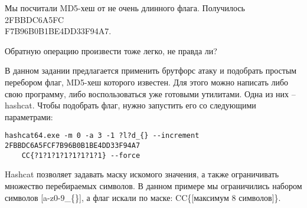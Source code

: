 
Мы посчитали MD5-хеш от не очень длинного флага. Получилось 2FBBDC6A5FC\\F7B96B0B1BE4DD33F94A7.

Обратную операцию произвести тоже легко, не правда ли?

\solutionSection

В данном задании предлагается применить брутфорс атаку и подобрать простым перебором флаг, MD5-хеш которого известен. Для этого можно написать либо свою программу, либо воспользоваться уже готовыми утилитами. Одна из них – hashcat. Чтобы подобрать флаг, нужно запустить его со следующими параметрами:
\begin{verbatim}
hashcat64.exe -m 0 -a 3 -1 ?l?d_{} --increment 2FBBDC6A5FCF7B96B0B1BE4DD33F94A7 
    CC{?1?1?1?1?1?1?1?1} --force
\end{verbatim}

Hashcat позволяет задавать маску искомого значения, а также ограничивать множество перебираемых символов. В данном примере мы ограничились набором символов [a-z0-9\_\{\}], а флаг искали по маске: CC\{[максимум 8 символов]\}.


